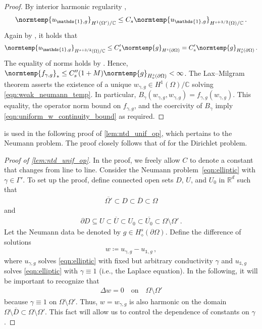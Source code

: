 \documentclass[pdflatex,sn-mathphys-num]{sn-jnl-preprint}
\newcommand{\R}{\mathbb{R}}
\newcommand{\C}{\mathbb{C}}
\newcommand{\pOmega}{{\partial\Omega}}
\newcommand{\norm}{\normtemp}
\newcommand{\defeq}{\coloneqq} %
\newcommand{\lap}{\Delta} %
\newcommand{\onebm}{\mathds{1}} %
\def\qon{\quad\text{on}\quad}
\theoremstyle{thmstyleone}%
\theoremstyle{thmstyletwo}%
\theoremstyle{thmstylethree}%
\numberwithin{equation}{section}
\numberwithin{theorem}{section}
\begin{document}
\begin{appendices}
\begin{proof}
    By interior harmonic regularity \cite[Lemma~22, p.~197, applied with exponents $1$ and $s+3/2$]{abraham2019statistical},
    \begin{align*}
        \norm{u_{\onebm,g}}_{H^{1}(\Omega')/\C}\leq C_s \norm{u_{\onebm,g}}_{H^{s+3/2}(\Omega)/\C}\,.
    \end{align*}
    Again by \cite[Chp. 2, Remark 7.2, pp.~188--189]{lions2012non}, it holds that
    \begin{align*}
        \norm{u_{\onebm,g}}_{H^{s+3/2}(\Omega)/\C}\leq C_s' \norm{g}_{H^s(\partial\Omega)}=C_s' \norm{g}_{{H}_\diamond^s(\partial\Omega)}\,.
    \end{align*}
    The equality of norms holds by \cite[Remark~(iii), p.~193]{abraham2019statistical}. Hence, $\norm{f_{\gamma,g}}_*\leq C_s'' (1+M) \norm{g}_{{H}_\diamond^s(\partial\Omega)}<\infty$. The Lax--Milgram theorem \cite[Thm.~1, Sec.~6.2.1, pp.~297--298]{evans1998partial} asserts the existence of a unique $w_{\gamma,g}\in H^1(\Omega)/\C$ solving \eqref{eqn:weak_neumann_temp}. In particular, $B_\gamma(w_{\gamma,g},w_{\gamma,g})=f_{\gamma,g}(w_{\gamma,g})$. This equality, the operator norm bound on $f_{\gamma,g}$, and the coercivity of $B_\gamma$ imply \eqref{eqn:uniform_w_continuity_bound} as required.    
\end{proof}

 is used in the following proof of \cref{lem:ntd_unif_op}, which pertains to the Neumann problem. The proof closely follows that of \cite[Lemma~20, p.~197]{abraham2019statistical} for the Dirichlet problem.
\begin{proof}[Proof of \cref{lem:ntd_unif_op}]
    In the proof, we freely allow $C$ to denote a constant that changes from line to line.
    Consider the Neumann problem~\eqref{eqn:elliptic} with $\gamma\in\Gamma'$. To set up the proof, define connected open sets $D$, $U$, and $U_0$ in $\R^d$ such that
	\begin{align*}
		\overline{\Omega'}\subset D\subset\overline{D}\subset\Omega 
	\end{align*}
	and
	\begin{align*}
		\partial D \subseteq U\subset \overline{U}\subset U_0\subset\overline{U_0}\subset \Omega\setminus\Omega'\,.
	\end{align*}
	Let the Neumann data be denoted by $g\in{H}_\diamond^s(\pOmega)$. Define the difference of solutions
	\begin{align*}
		w\defeq u_{\gamma,g}-u_{\onebm,g}\,,
	\end{align*}
	where $u_{\gamma,g}$ solves \eqref{eqn:elliptic} with fixed but arbitrary conductivity $\gamma$ and $u_{\onebm,g}$ solves \eqref{eqn:elliptic} with $\gamma\equiv 1$ (i.e., the Laplace equation). In the following, it will be important to recognize that
	\begin{align*}
		\lap w=0 \qon \Omega\setminus \Omega'
	\end{align*}
	because $\gamma\equiv 1$ on $\Omega\setminus \Omega'$. Thus, $w=w_{\gamma,g}$ is also harmonic on the domain $\Omega\setminus\overline{D}\subset \Omega\setminus \Omega'$. This fact will allow us to control the dependence of constants on $\gamma$.
	

\end{proof}
\end{appendices}
\end{document}
